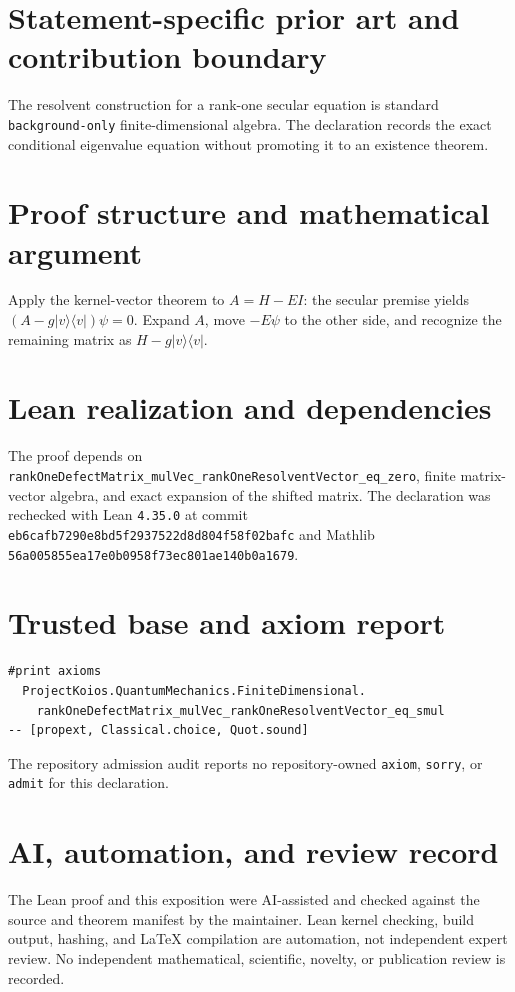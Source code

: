 \documentclass[11pt]{article}
\begin{document}
\section{Statement-specific prior art and contribution boundary}
The resolvent construction for a rank-one secular equation is standard \texttt{background-only} finite-dimensional algebra.  The declaration records the exact conditional eigenvalue equation without promoting it to an existence theorem.

\section{Proof structure and mathematical argument}
Apply the kernel-vector theorem to $A=H-EI$: the secular premise yields
$(A-g|v\rangle\langle v|)\psi=0$.  Expand $A$, move $-E\psi$ to the other side, and recognize the remaining matrix as $H-g|v\rangle\langle v|$.

\section{Lean realization and dependencies}
The proof depends on \texttt{rankOneDefectMatrix\_mulVec\_rankOneResolventVector\_eq\_zero}, finite matrix-vector algebra, and exact expansion of the shifted matrix.  The declaration was rechecked with Lean \texttt{4.35.0} at commit \texttt{eb6cafb7290e8bd5f2937522d8d804f58f02bafc} and Mathlib \texttt{56a005855ea17e0b0958f73ec801ae140b0a1679}.

\section{Trusted base and axiom report}
\begin{verbatim}
#print axioms
  ProjectKoios.QuantumMechanics.FiniteDimensional.
    rankOneDefectMatrix_mulVec_rankOneResolventVector_eq_smul
-- [propext, Classical.choice, Quot.sound]
\end{verbatim}
The repository admission audit reports no repository-owned \texttt{axiom}, \texttt{sorry}, or
\texttt{admit} for this declaration.

\section{AI, automation, and review record}
The Lean proof and this exposition were AI-assisted and checked against the source and theorem
manifest by the maintainer.  Lean kernel checking, build output, hashing, and LaTeX compilation are
automation, not independent expert review.  No independent mathematical, scientific, novelty, or
publication review is recorded.
\end{document}
